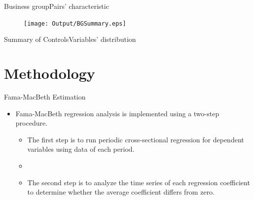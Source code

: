 \documentclass{beamer}
\begin{document}
	\begin{frame}{Business group}{Pairs' characteristic}
		\begin{figure}[htbp]
			\texttt{[image: Output/BGSummary.eps]}
			
		\end{figure}
	\end{frame}
	
	
	
	
	\begin{frame}{Summary of Controls}{Variables' distribution } \label{Monthly2}

		
		\begin{table}[htbp]
			\centering 
			\scriptsize
			{
				
			}
		\end{table}
		
		
	\end{frame}
	
	
	\section{Methodology}
	
	\begin{frame}{Fama-MacBeth Estimation}
		\begin{itemize}
			\item Fama-MacBeth regression analysis is implemented using a two-step procedure. 
			\begin{itemize}
				\item The first step is to
				run periodic cross-sectional regression for dependent variables using data of each period.
				\item[]
				\item
				The second step is to analyze the time series
				of each regression coefficient to determine whether the average coefficient differs from zero.
			\end{itemize}
			
		\end{itemize}
	\end{frame}
	
\end{document}
